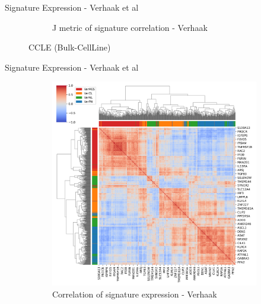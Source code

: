 \documentclass[aspectratio=169,9pt]{beamer}
\begin{document}
\begin{frame}{Signature Expression - Verhaak et al}
\begin{adjustwidth}{-5cm}{-5cm}
\begin{figure}
\begin{subfigure}[c]{0.4\textwidth}
                    \caption{J metric of signature correlation - Verhaak}
                \end{subfigure}
                \caption{CCLE (Bulk-CellLine)}
            \end{figure}
        \end{adjustwidth}
    \end{frame}

    \begin{frame}{Signature Expression - Verhaak et al}
        \begin{adjustwidth}{-5cm}{-5cm}
            \centering
            \begin{figure}\ContinuedFloat
                \centering
                \begin{subfigure}[c]{0.48\textwidth}
                    \centering
                    \includegraphics[width=\textwidth]{TCGA_Corrplot_Ver}
                    \caption{Correlation of signature expression - Verhaak}
                \end{subfigure}
                \begin{subfigure}[c]{0.4\textwidth}
                    \centering

\end{subfigure}
\end{figure}
\end{adjustwidth}
\end{frame}
\end{document}
